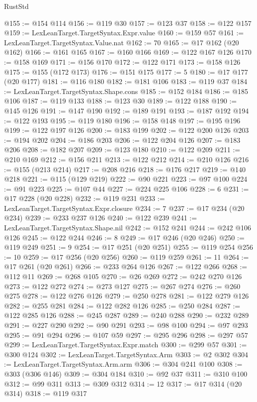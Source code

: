 \begin{lexlean}{RustStd}
\begin{coremodule}
@155 := @154 @114
@156 := @119 @30
@157 := @123 @37
@158 := @122 @157
@159 := LexLeanTarget.TargetSyntax.Expr.value
@160 := @159 @57
@161 := LexLeanTarget.TargetSyntax.Value.nat
@162 := 70
@165 := @17 @162 (@20 @162)
@166 := @161 @165
@167 := @160 @166
@169 := @122 @167 @126
@170 := @158 @169
@171 := @156 @170
@172 := @122 @171
@173 := @158 @126
@175 := @155 (@172 @173)
@176 := @151 @175
@177 := 5
@180 := @17 @177 (@20 @177)
@181 := @116 @180
@182 := @181 @106
@183 := @119 @37
@184 := LexLeanTarget.TargetSyntax.Shape.cons
@185 := @152 @184
@186 := @185 @106
@187 := @119 @133
@188 := @123 @30
@189 := @122 @188
@190 := @145 @126
@191 := @147 @190
@192 := @189 @191
@193 := @187 @192
@194 := @122 @193
@195 := @119 @180
@196 := @158 @148
@197 := @195 @196
@199 := @122 @197 @126
@200 := @183 @199
@202 := @122 @200 @126
@203 := @194 @202
@204 := @186 @203
@206 := @122 @204 @126
@207 := @183 @206
@208 := @182 @207
@209 := @123 @180
@210 := @122 @209
@211 := @210 @169
@212 := @156 @211
@213 := @122 @212
@214 := @210 @126
@216 := @155 (@213 @214)
@217 := @208 @216
@218 := @176 @217
@219 := @140 @218
@221 := @115 (@129 @219)
@222 := @90 @221
@223 := @97 @100
@224 := @91 @223
@225 := @107 @44
@227 := @224 @225 @106
@228 := 6
@231 := @17 @228 (@20 @228)
@232 := @119 @231
@233 := LexLeanTarget.TargetSyntax.Expr.closure
@234 := 7
@237 := @17 @234 (@20 @234)
@239 := @233 @237 @126
@240 := @122 @239
@241 := LexLeanTarget.TargetSyntax.Shape.nil
@242 := @152 @241
@244 := @242 @106 @126
@245 := @122 @244
@246 := 8
@249 := @17 @246 (@20 @246)
@250 := @119 @249
@251 := 9
@254 := @17 @251 (@20 @251)
@255 := @119 @254
@256 := 10
@259 := @17 @256 (@20 @256)
@260 := @119 @259
@261 := 11
@264 := @17 @261 (@20 @261)
@266 := @233 @264 @126
@267 := @122 @266
@268 := @112 @11
@269 := @268 @105
@270 := @26 @269
@272 := @242 @270 @126
@273 := @122 @272
@274 := @273 @127
@275 := @267 @274
@276 := @260 @275
@278 := @122 @276 @126
@279 := @250 @278
@281 := @122 @279 @126
@282 := @255 @281
@284 := @122 @282 @126
@285 := @250 @284
@287 := @122 @285 @126
@288 := @245 @287
@289 := @240 @288
@290 := @232 @289
@291 := @227 @290
@292 := @90 @291
@293 := @98 @100
@294 := @97 @293
@295 := @91 @294
@296 := @107 @59
@297 := @295 @296
@298 := @297 @57
@299 := LexLeanTarget.TargetSyntax.Expr.match
@300 := @299 @57
@301 := @300 @124
@302 := LexLeanTarget.TargetSyntax.Arm
@303 := @2 @302
@304 := LexLeanTarget.TargetSyntax.Arm.arm
@306 := @304 @241 @100
@308 := @303 (@306 @146)
@309 := @304 @184
@310 := @92 @37
@311 := @310 @100
@312 := @99 @311
@313 := @309 @312
@314 := 12
@317 := @17 @314 (@20 @314)
@318 := @119 @317

\end{coremodule}
\end{lexlean}
